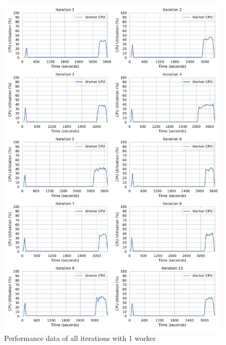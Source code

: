 \begin{figure}[h]
\centering
\includegraphics[scale=0.4]{images/07_evaluation/classification/1_worker_cpu_performance}
\caption{Performance data of all iterations with 1 worker}
\label{fig:appendix_eval_classification_static1}
\end{figure}

